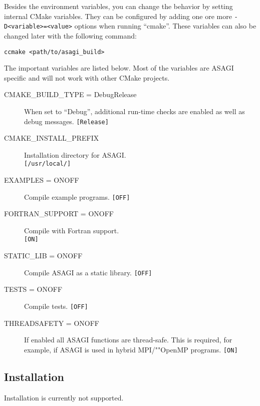 Besides the environment variables, you can change the behavior by setting internal CMake variables. They can be configured by adding one ore more \texttt{-D<variable>=<value>} options when running ``cmake''. These variables can also be changed later with the following command:
\lstset{language=bash}
\begin{lstlisting}
ccmake <path/to/asagi_build>
\end{lstlisting}

The important variables are listed below. Most of the variables are ASAGI specific and will not work with other CMake projects.
\begin{description}
 \item[CMAKE\_BUILD\_TYPE = Debug\textbar Release] When set to ``Debug'', addi\-tion\-al run-time checks are enabled as well as debug messages. \texttt{[Release]}
 \item[CMAKE\_INSTALL\_PREFIX] Installation directory for ASAGI.\\ \texttt{[/usr/local/]}
 \item[EXAMPLES = ON\textbar OFF] Compile example programs. \texttt{[OFF]}
 \item[FORTRAN\_SUPPORT = ON\textbar OFF] Compile with Fortran support.\\ \texttt{[ON]}
 \item[STATIC\_LIB = ON\textbar OFF] Compile ASAGI as a static library. \texttt{[OFF]}
 \item[TESTS = ON\textbar OFF] Compile tests. \texttt{[OFF]}
 \item[THREADSAFETY = ON\textbar OFF] If enabled all ASAGI functions are thread-safe. This is required, for example, if ASAGI is used in hybrid MPI/""OpenMP programs. \texttt{[ON]}
\end{description}

\subsection{Installation}

Installation is currently not supported.